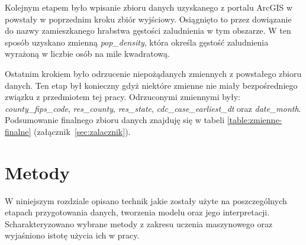 \documentclass[polish, twoside, 12pt, a4paper]{article}
\theoremstyle{definition}
\theoremstyle{plain}
\theoremstyle{remark}
\begin{document}
Kolejnym etapem było wpisanie zbioru danych uzyskanego z portalu ArcGIS w powstały w poprzednim kroku zbiór wyjściowy. Osiągnięto to przez dowiązanie do nazwy zamieszkanego hrabstwa gęstości zaludnienia w tym obszarze. W ten sposób uzyskano zmienną \emph{pop\_density}, która określa gęstość zaludnienia wyrażoną w liczbie osób na mile kwadratową.

Ostatnim krokiem było odrzucenie niepożądanych zmiennych z powstałego zbioru danych. Ten etap był konieczny gdyż niektóre zmienne nie miały bezpośredniego związku z przedmiotem tej pracy. Odrzuconymi zmiennymi były:  \emph{county\_fips\_code},  \emph{res\_county}, \emph{res\_state}, \emph{cdc\_case\_earliest\_dt} oraz \emph{date\_month}. Podsumowanie finalnego zbioru danych znajduję się w tabeli \ref{table:zmienne-finalne} (załącznik~\ref{sec:zalacznik}).


\clearpage
\section{Metody}


W niniejszym rozdziale opisano technik jakie zostały użyte na poszczególnych etapach przygotowania danych, tworzenia modelu oraz jego interpretacji. Scharakteryzowano wybrane metody z zakresu uczenia maszynowego oraz wyjaśniono istotę użycia ich w pracy.

\end{document}
